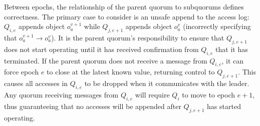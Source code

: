 Between epochs, the relationship of the parent quorum to subquorums defines correctness.
The primary case to consider is an unsafe append to the access log: $Q_{i,e}$
appends object $o_a^{v+1}$ while $Q_{j,e+1}$ appends object $o_a^v$ (incorrectly
specifying that $o_a^{v+1} \rightarrow o_a^v$).
It is the parent quorum's responsibility to ensure that $Q_{j,e+1}$ does not start
operating until it has received confirmation from $Q_{i,e}$ that it has terminated.
If the parent quorum does not receive a message from $Q_{i,e}$, it can force epoch $e$ to
close at the latest known value, returning control to $Q_{j,e+1}$.
This causes all accesses in $Q_{i,e}$ to be dropped when it communicates with the leader.
Any quorum receiving messages from $Q_{i,e}$ will require $Q_i$ to move to epoch $e+1$,
thus guaranteeing that no accesses will be appended after $Q_{j,e+1}$ has started
operating.
